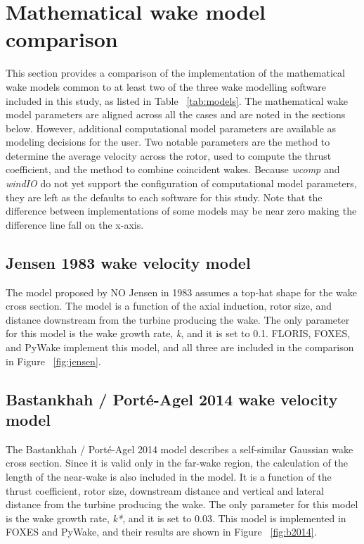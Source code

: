 \documentclass{iopconfser}
\begin{document}
\section{Mathematical wake model comparison} \label{comparison}

This section provides a comparison of the implementation of the mathematical wake models common to at least two of the three wake modelling software included in this study, as listed in Table ~\ref{tab:models}.
The mathematical wake model parameters are aligned across all the cases and are noted in the sections below.
However, additional computational model parameters are available as modeling decisions for the user.
Two notable parameters are the method to determine the average velocity across the rotor, used to compute the thrust coefficient, and the method to combine coincident wakes.
Because \textit{wcomp} and \textit{windIO} do not yet support the configuration of computational model parameters, they are left as the defaults to each software for this study.
Note that the difference between implementations of some models may be near zero making the difference line fall on the x-axis.

\subsection{Jensen 1983 wake velocity model}
The model proposed by NO Jensen in 1983 assumes a top-hat shape for the wake cross section.
The model is a function of the axial induction, rotor size, and distance downstream from the turbine producing the wake.
The only parameter for this model is the wake growth rate, \textit{k}, and it is set to 0.1.
FLORIS, FOXES, and PyWake implement this model, and all three are included in the comparison in Figure ~\ref{fig:jensen}.

\subsection{Bastankhah / Porté-Agel 2014 wake velocity model}
The Bastankhah / Porté-Agel 2014 model describes a self-similar Gaussian wake cross section.
Since it is valid only in the far-wake region, the calculation of the length of the near-wake is also included in the model.
It is a function of the thrust coefficient, rotor size, downstream distance and vertical and lateral distance from the turbine producing the wake.
The only parameter for this model is the wake growth rate, \textit{k*}, and it is set to 0.03.
This model is implemented in FOXES and PyWake, and their results are shown in Figure ~\ref{fig:b2014}.
\end{document}
